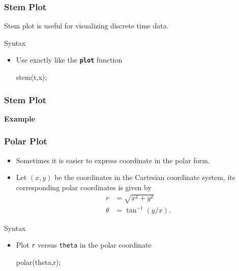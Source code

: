 \documentclass{beamer}  %
\newcommand{\tttbf}[1]{\texttt{\textbf{#1}}} %
\begin{document}
\begin{frame}[fragile]
\frametitle{Stem Plot}
Stem plot is useful for visualizing discrete time data.

\begin{block}{Syntax}
\begin{itemize}
    \item Use exactly like the \tttbf{plot} function
          \begin{matlabcodebeamer}[numbers=none,frame=none]
          stem(t,x);
          \end{matlabcodebeamer}
\end{itemize}
\end{block}

\end{frame}
\begin{frame}[fragile]
\frametitle{Stem Plot}
\textbf{Example} 

\setcounter{subfigure}{0}
\begin{figure}
    \centering
\end{figure}

\end{frame}
\begin{frame}[fragile]
\frametitle{Polar Plot}
\begin{itemize}[<+->]
    \item Sometimes it is easier to express coordinate in the polar form.
    \item Let $(x,y)$ be the coordinates in the Cartesian coordinate system, its corresponding polar coordinates is given by
\begin{align}
    r      &= \sqrt{x^2 + y^2} \\
    \theta &= \tan^{-1}(y/x).
\end{align}
\end{itemize}

\pause
\begin{block}{Syntax}
\begin{itemize}
    \item Plot \texttt{r} versus \texttt{theta} in the polar coordinate
          \begin{matlabcodebeamer}[numbers=none,frame=none]
          polar(theta,r);
          \end{matlabcodebeamer}
\end{itemize}
\end{block}

\end{frame}
\end{document}
